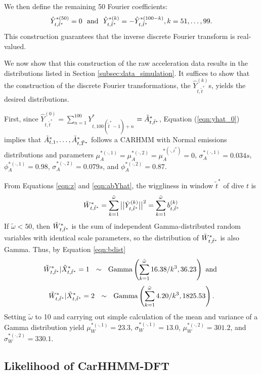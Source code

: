    We then define the remaining 50 Fourier coefficients:
    \[
    \hat{Y}^{*(50)}_{t,\tilde t^*} = 0 {\rm{~~and ~~}}
	\hat{Y}^{*(k)}_{t,\tilde t^*} = -\hat{Y}^{*(100-k)}_{t,\tilde t^*} , k = 51,\ldots,99.
\]
   This construction guarantees that the inverse discrete Fourier transform is real-valued. 
  

We now show that this construction of the raw acceleration data  results in the distributions listed in Section \ref{subsec:data_simulation}. It suffices to show that the construction of the discrete Fourier transformations, the $\hat{Y}^{(k)}_{t,\tilde t^*}$s, yields the desired distributions.

First, since $\hat{Y}^{(0)}_{t,\tilde t^*} = \sum_{n=1}^{100} Y^*_{t,100(\tilde t^* - 1) + n} $ $=\tilde{A}^*_{t,\tilde{t}^*}$, Equation (\ref{eqn:yhat_0}) implies that 
$\tilde{A}^*_{t,1}, \ldots, \tilde{A}^*_{t,\tilde{T}^*}$ 
follows a CARHMM with Normal emissions distributions and parameters 
 $\mu_A^{*(\cdot,1)} = \mu_A^{*(\cdot,2)} = \mu_A^{*(\cdot,i^*)} = 0$,  $\sigma_A^{*(\cdot,1)} = 0.034s$, $\phi_A^{*(\cdot,1)} = 0.98$, $\sigma_A^{*(\cdot,2)} = 0.079s$, and $\phi_A^{*(\cdot,2)} = 0.87$.

 From Equations \ref{eqn:z} and \ref{eqn:abYhat}, 
 the  wiggliness in window $\tilde t^*$  of dive $t$ is 
\[
    \tilde{W}^*_{t,\tilde t^*} = \sum_{k=1}^{\tilde \omega} \big|\big|\hat{Y}^{(k)}_{t,\tilde t^*}\big|\big|^2 =  \sum_{k=1}^{\tilde \omega} b^{(k)}_{t,\tilde t^*}
\]
%
If $\tilde \omega < 50$, then $\tilde{W}^*_{t,\tilde t^*}$ is the sum of independent Gamma-distributed random variables with identical scale parameters, so the distribution of $\tilde{W}^*_{t,\tilde t^*}$ is also Gamma.  Thus, by Equation  \ref{eqn:bdist}
%
\[
\tilde{W}^*_{t,\tilde t^*}|\tilde X^*_{t,\tilde t^*} = 1  ~~ \sim ~~ {\rm{Gamma}}\left(\sum_{k=1}^{\tilde \omega} 16.38/k^3 , 36.23 \right) 
\text { and }
\]
\[
\tilde{W}^*_{t,\tilde t^*}|\tilde X^*_{t,\tilde t^*} = 2 ~~\sim~~ {\rm{Gamma}}\left(\sum_{k=1}^{\tilde \omega} 4.20/k^3 , 1825.53 \right).
\]
Setting $\tilde \omega$ to 10 and carrying out simple calculation of the mean and variance of a Gamma distribution yield $\mu_W^{*(\cdot,1)} = 23.3$, $\sigma_W^{*(\cdot,1)} = 13.0$, $\mu_W^{*(\cdot,2)} = 301.2$, and $\sigma_W^{*(\cdot,2)} = 330.1$.


\subsection{Likelihood of CarHHMM-DFT}


